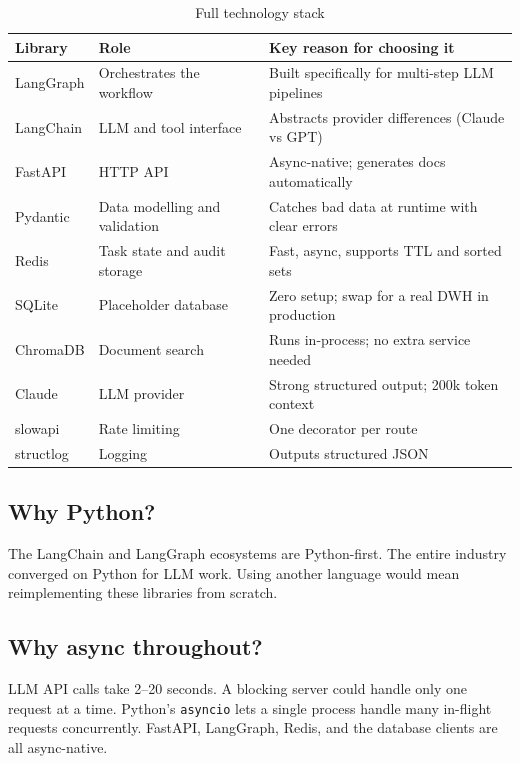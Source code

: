 \documentclass[12pt,a4paper]{article}
\begin{document}
\begin{table}[H]
\centering
\small
\begin{tabular}{@{}p{2.4cm}p{4.8cm}p{6.5cm}@{}}
\toprule
\textbf{Library} & \textbf{Role} & \textbf{Key reason for choosing it} \\
\midrule
LangGraph   & Orchestrates the workflow          & Built specifically for multi-step LLM pipelines \\
LangChain   & LLM and tool interface             & Abstracts provider differences (Claude vs GPT) \\
FastAPI     & HTTP API                           & Async-native; generates docs automatically \\
Pydantic    & Data modelling and validation      & Catches bad data at runtime with clear errors \\
Redis       & Task state and audit storage       & Fast, async, supports TTL and sorted sets \\
SQLite      & Placeholder database               & Zero setup; swap for a real DWH in production \\
ChromaDB    & Document search                    & Runs in-process; no extra service needed \\
Claude      & LLM provider                       & Strong structured output; 200k token context \\
slowapi     & Rate limiting                      & One decorator per route \\
structlog   & Logging                            & Outputs structured JSON \\
\bottomrule
\end{tabular}
\caption{Full technology stack}
\end{table}

\subsection{Why Python?}

The LangChain and LangGraph ecosystems are Python-first. The entire industry converged on Python for LLM work. Using another language would mean reimplementing these libraries from scratch.

\subsection{Why async throughout?}

LLM API calls take 2--20 seconds. A blocking server could handle only one request at a time. Python's \texttt{asyncio} lets a single process handle many in-flight requests concurrently. FastAPI, LangGraph, Redis, and the database clients are all async-native.
\end{document}
